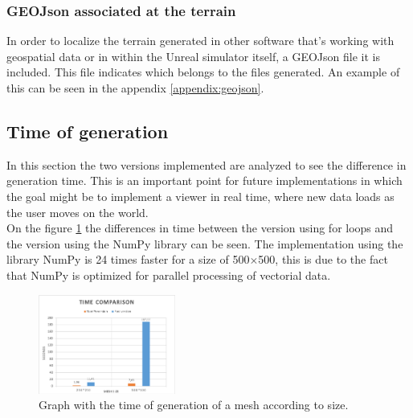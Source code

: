 \documentclass[10pt,a4paper,twocolumn,twoside]{article}
\begin{document}
\subsubsection{GEOJson associated at the terrain}

In order to localize the terrain generated in other software that's working with geospatial data or in within the Unreal simulator itself, a GEOJson file it is included. This file indicates which belongs to the files generated. An example of this can be seen in the appendix \ref{appendix:geojson}.

\subsection{Time of generation}
In this section the two versions implemented are analyzed to see the difference in generation time. This is an important point for future implementations in which the goal might be to implement a viewer in real time, where new data loads as the user moves on the world.
\\
On the figure \ref{fig-meshtime} the differences in time between the version using for loops and the version using the NumPy library can be seen. The implementation using the library NumPy is 24 times faster for a size of 500$\times$500, this is due to the fact that NumPy is optimized for parallel processing of vectorial data.

\begin{figure}[!h]
\centering
  	\includegraphics[width=0.4\textwidth]{meshtime}
	\caption{Graph with the time of generation of a mesh according to size.}
	\label{fig-meshtime}
\end{figure}
\end{document}
